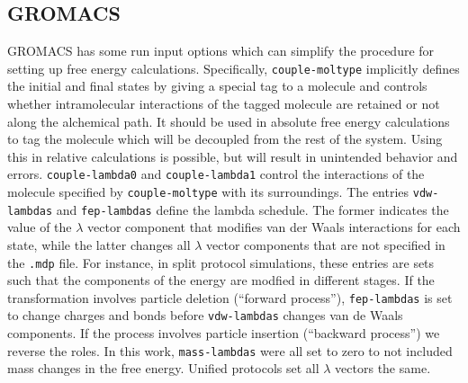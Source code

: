 \documentclass[journal=jctcce,manuscript=article]{achemso}
\newcommand{\inpopt}[1]{\texttt{#1}}
\begin{document}



\subsection{GROMACS}
\label{sec:gromacs-results}

GROMACS has some run input options which can simplify the procedure 
for setting up free energy calculations.  Specifically, \inpopt{couple-moltype} 
implicitly defines the initial and final states by giving a special tag to a 
molecule and controls whether intramolecular interactions of the tagged 
molecule are retained or not along the alchemical path.  It should be used in 
absolute free energy calculations to tag the molecule which will be decoupled 
from the rest of the system.
Using this in relative calculations is possible, but will result in unintended 
behavior and errors.  \inpopt{couple-lambda0} and 
\inpopt{couple-lambda1} control the interactions of the molecule specified by 
\inpopt{couple-moltype} with its surroundings.
The entries \inpopt{vdw-lambdas} and \inpopt{fep-lambdas} 
define the lambda schedule.  The former indicates the value of the $\lambda$ 
vector component that modifies van der Waals interactions for each state,
while the latter changes all $\lambda$ vector components that are not specified 
in the \inpopt{.mdp} file.  For instance, in split protocol simulations, these 
entries are sets such that the components of the energy are modfied in 
different stages.  If the transformation involves particle deletion (``forward 
process''), \inpopt{fep-lambdas} is set to change charges and bonds
before \inpopt{vdw-lambdas} changes van de Waals components.
If the process involves particle insertion (``backward process'') we reverse 
the roles.  In this work, \inpopt{mass-lambdas} were all set to zero  to not 
included mass changes in the free energy.  Unified protocols set all $\lambda$ 
vectors the same.
\end{document}
